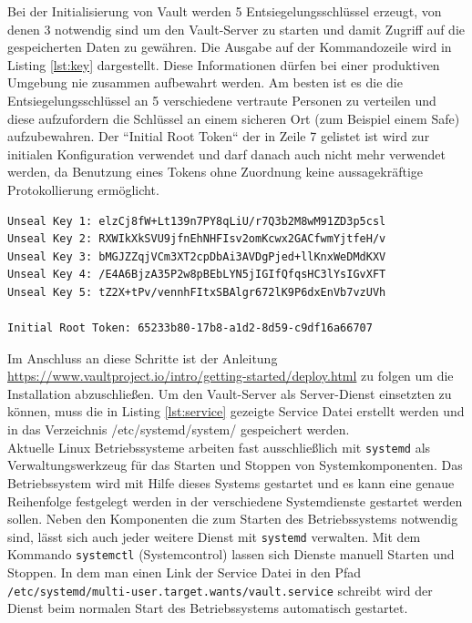 \documentclass[
book,
a4paper,   
titlepage,  
halfparskip,
12pt        
]{scrartcl}
\newcommand\inline{\lstinline[basicstyle=\ttfamily]}
\begin{document}
\begin{onehalfspacing}
Bei der Initialisierung von Vault werden 5 Entsiegelungsschlüssel erzeugt, von denen 3 notwendig sind um den Vault-Server zu starten und damit Zugriff auf die gespeicherten Daten zu gewähren. Die Ausgabe auf der Kommandozeile wird in Listing \vref{lst:key} dargestellt.
Diese Informationen dürfen bei einer produktiven Umgebung nie zusammen aufbewahrt werden. Am besten ist es die die Entsiegelungsschlüssel an 5 verschiedene vertraute Personen zu verteilen und diese aufzufordern die Schlüssel an einem sicheren Ort (zum Beispiel einem Safe) aufzubewahren. Der ``Initial Root Token`` der in Zeile 7 gelistet ist wird zur initialen Konfiguration verwendet und darf danach auch nicht mehr verwendet werden, da Benutzung eines Tokens ohne Zuordnung keine aussagekräftige Protokollierung ermöglicht.

\begin{lstlisting}[caption={[Initialisierung Vault] Ausgabe der 5 Schlüsselfragmente von denen 3 nötig sind um den Hauptschlüssel zu rekonstruieren}, label=lst:key, captionpos=b, basicstyle=\ttfamily]
Unseal Key 1: elzCj8fW+Lt139n7PY8qLiU/r7Q3b2M8wM91ZD3p5csl
Unseal Key 2: RXWIkXkSVU9jfnEhNHFIsv2omKcwx2GACfwmYjtfeH/v
Unseal Key 3: bMGJZZqjVCm3XT2cpDbAi3AVDgPjed+llKnxWeDMdKXV
Unseal Key 4: /E4A6BjzA35P2w8pBEbLYN5jIGIfQfqsHC3lYsIGvXFT
Unseal Key 5: tZ2X+tPv/vennhFItxSBAlgr672lK9P6dxEnVb7vzUVh

Initial Root Token: 65233b80-17b8-a1d2-8d59-c9df16a66707

\end{lstlisting}


Im Anschluss an diese Schritte ist der Anleitung \url{https://www.vaultproject.io/intro/getting-started/deploy.html} zu folgen um die Installation abzuschließen. Um den Vault-Server als Server-Dienst einsetzten zu können, muss die in Listing \vref{lst:service} gezeigte Service Datei erstellt werden und in das Verzeichnis /etc/systemd/system/ gespeichert werden.\\
Aktuelle Linux Betriebssysteme arbeiten fast ausschließlich mit \inline|systemd| als Verwaltungswerkzeug für das Starten und Stoppen von Systemkomponenten. Das Betriebssystem wird mit Hilfe dieses Systems gestartet und es kann eine genaue Reihenfolge festgelegt werden in der verschiedene Systemdienste gestartet werden sollen. Neben den Komponenten die zum Starten des Betriebssystems notwendig sind, lässt sich auch jeder weitere Dienst mit \inline|systemd| verwalten. Mit dem Kommando \inline|systemctl| (Systemcontrol) lassen sich Dienste manuell Starten und Stoppen. In dem man einen Link der Service Datei in den Pfad \inline|/etc/systemd/multi-user.target.wants/vault.service| schreibt wird der Dienst beim normalen Start des Betriebssystems automatisch gestartet.\cite{systemd}


\end{onehalfspacing}
\end{document}

